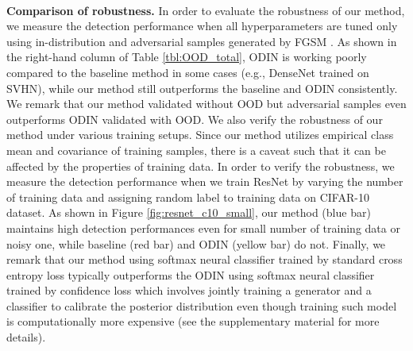 \documentclass{article}
\begin{document}
\begin{figure*} [t] \centering\setlength{\tabcolsep}{0cm}
\,
\caption{Comparison of AUROC (\%) under extreme scenarios: (a) small number of training data, where the x-axis represents the number of training data. (b) Random label is assigned to training data, where the x-axis represents the percentage of training data with random label.}
\label{fig:resnet_c10_small}
\end{figure*}

{\bf Comparison of robustness.}
In order to evaluate the robustness of our method,
we measure the detection performance when all hyperparameters are tuned only using in-distribution and adversarial samples generated by FGSM \citep{goodfellow2014explaining}.
As shown in the right-hand column of Table \ref{tbl:OOD_total},
ODIN is working poorly compared to the baseline method in some cases (e.g., DenseNet trained on SVHN), while our method still outperforms the baseline and ODIN consistently.
We remark that our method validated without OOD but adversarial samples even outperforms ODIN validated with OOD.
We also verify the robustness of our method under various training setups. Since our method utilizes empirical class mean and covariance of training samples, there is a caveat such that it can be affected by the properties of training data. 
In order to verify the robustness,
we measure the detection performance when we train ResNet by varying the number of training data and assigning random label to training data on CIFAR-10 dataset.
As shown in Figure \ref{fig:resnet_c10_small}, 
our method (blue bar) maintains high detection performances even for small number of training data or noisy one, while baseline (red bar) and ODIN (yellow bar) do not.
Finally, we remark that our method using softmax neural classifier trained by standard cross entropy loss typically outperforms the ODIN using softmax neural classifier trained by confidence loss \citep{lee2017training} which involves jointly training a generator and a classifier to calibrate the posterior distribution even though training such model is computationally more expensive (see the supplementary material for more details).
\end{document}

